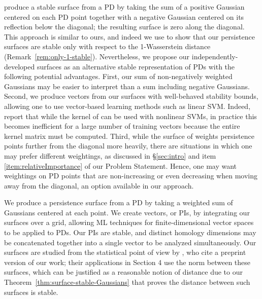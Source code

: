 \documentclass[11pt]{article}
\begin{document}
\citet{reininghaus2015stable} produce a stable surface from a PD by taking the sum of a positive Gaussian centered on each PD point together with a negative Gaussian centered on its reflection below the diagonal; the resulting surface is zero along the diagonal. This approach is similar to ours, and indeed we use \citep[Theorem~3]{reininghaus2015stable} to show that our persistence surfaces are stable only with respect to the 1-Wasserstein distance (Remark~\ref{rem:only-1-stable}). Nevertheless, we propose our independently-developed surfaces as an alternative stable representation of PDs with the following potential advantages. First, our sum of non-negatively weighted Gaussians may be easier to interpret than a sum including negative Gaussians. Second, we produce vectors from our surfaces with well-behaved stability bounds, allowing one to use vector-based learning methods such as linear SVM. Indeed, \citet{zeppelzauer2016topological} report that while the kernel of \citet{reininghaus2015stable} can be used with nonlinear SVMs, in practice this becomes inefficient for a large number of training vectors because the entire kernel matrix must be computed. Third, while the surface of \citet{reininghaus2015stable} weights persistence points further from the diagonal more heavily, there are situations in which one may prefer different weightings, as discussed in \S\ref{sec:intro} and item  \ref{item:relativeImportance} of our Problem Statement. Hence, one may want weightings on PD points that are non-increasing or even decreasing when moving away from the diagonal, an option available in our approach.


We produce a persistence surface from a PD by taking a weighted sum of Gaussians centered at each point. We create vectors, or PIs, by integrating our surfaces over a grid, allowing ML techniques for finite-dimensional vector spaces to be applied to PDs. Our PIs are stable, and distinct homology dimensions may be concatenated together into a single vector to be analyzed simultaneously. Our surfaces are studied from the statistical point of view by \citet{chen2015statistical}, who cite a preprint version of our work; their applications in Section 4 use the  norm between these surfaces, which can be justified as a reasonable notion of distance due to our Theorem~\ref{thm:surface-stable-Gaussians} that proves the  distance between such surfaces is stable.
\end{document}
